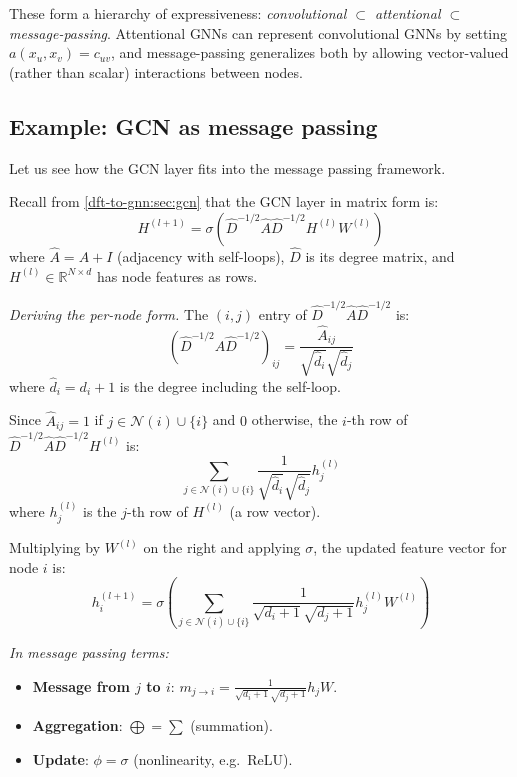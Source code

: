 \begin{notechapter}
These form a hierarchy of expressiveness:
\emph{convolutional $\subset$ attentional $\subset$ message-passing}.
Attentional GNNs can represent convolutional GNNs by setting
$a(x_u, x_v) = c_{uv}$, and message-passing generalizes both by allowing
vector-valued (rather than scalar) interactions between nodes.

\subsection{Example: GCN as message passing}

Let us see how the GCN layer fits into the message passing framework.

\begin{example}
Recall from \cref{dft-to-gnn:sec:gcn} that the GCN layer in matrix form is:
\[
H^{(l+1)} = \sigma\left( \hat{D}^{-1/2} \hat{A} \hat{D}^{-1/2}
             H^{(l)} W^{(l)} \right)
\]
where $\hat{A} = A + I$ (adjacency with self-loops), $\hat{D}$ is
its degree matrix, and $H^{(l)} \in \mathbb{R}^{N \times d}$ has node
features as rows.

\emph{Deriving the per-node form.} The $(i,j)$ entry of
$\hat{D}^{-1/2} \hat{A} \hat{D}^{-1/2}$ is:
\[
\left(\hat{D}^{-1/2} \hat{A} \hat{D}^{-1/2}\right)_{ij} =
\frac{\hat{A}_{ij}}{\sqrt{\hat{d}_i}\sqrt{\hat{d}_j}}
\]
where $\hat{d}_i = d_i + 1$ is the degree including the self-loop.

Since $\hat{A}_{ij} = 1$ if $j \in \mathcal{N}(i) \cup \{i\}$ and $0$
otherwise, the $i$-th row of $\hat{D}^{-1/2} \hat{A} \hat{D}^{-1/2} H^{(l)}$ is:
\[
\sum_{j \in \mathcal{N}(i) \cup \{i\}}
    \frac{1}{\sqrt{\hat{d}_i}\sqrt{\hat{d}_j}} h_j^{(l)}
\]
where $h_j^{(l)}$ is the $j$-th row of $H^{(l)}$ (a row vector).

Multiplying by $W^{(l)}$ on the right and applying $\sigma$, the
updated feature vector for node $i$ is:
\[
h_i^{(l+1)} = \sigma\left( \sum_{j \in \mathcal{N}(i) \cup \{i\}}
    \frac{1}{\sqrt{d_i + 1}\sqrt{d_j + 1}} h_j^{(l)} W^{(l)} \right)
\]

\emph{In message passing terms:}
\begin{itemize}
    \item \textbf{Message from $j$ to $i$}:
          $m_{j \to i} = \frac{1}{\sqrt{d_i+1}\sqrt{d_j+1}} h_j W$.
    \item \textbf{Aggregation}: $\bigoplus = \sum$ (summation).
    \item \textbf{Update}: $\phi = \sigma$ (nonlinearity, e.g.\ ReLU).
\end{itemize}


\end{example}
\end{notechapter}

